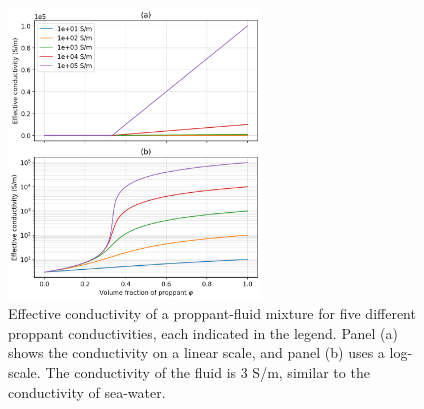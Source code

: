 \begin{figure}
    \begin{center}
    \includegraphics[width=0.6\textwidth]{figures/phys_prop_model/emt_spherical_particles.png}
    \end{center}
\caption{
    Effective conductivity of a proppant-fluid mixture for five different proppant
    conductivities, each indicated in the legend. Panel (a) shows the conductivity on a linear
    scale, and panel (b) uses a log-scale.
    The conductivity of the fluid is 3 S/m, similar to the conductivity of sea-water.
}
\label{fig:emt_spherical_particles}
\end{figure}
